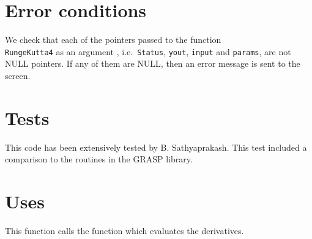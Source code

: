 \documentclass[12pt]{article}
\begin{document}
\section{Error conditions}

We check that each of the pointers passed to the function \\ \texttt{RungeKutta4} as an argument , i.e.\ \texttt{Status}, \texttt{yout}, \texttt{input} and \texttt{params}, are not NULL pointers. If any of them are NULL, then an error message is sent to the screen.


\section{Tests}

This code has been extensively tested by B. Sathyaprakash. This test included a comparison to the routines in the GRASP library.

\section{Uses}

This function calls the function which evaluates the derivatives. 
\end{document}
